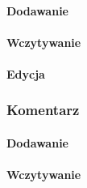 \paragraph{Dodawanie}
\paragraph{Wczytywanie}
\paragraph{Edycja}
\subsubsection{Komentarz}
\paragraph{Dodawanie}
\paragraph{Wczytywanie}
